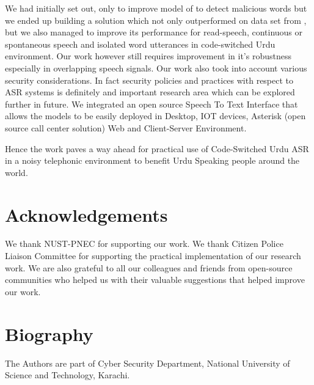 \documentclass[lettersize,journal]{IEEEtran}
\begin{document}
We had initially set out, only to improve model of \cite{sehar_gul_detecting_2020} to detect malicious words but we ended up building a solution which not only outperformed on data set from \cite{sehar_gul_detecting_2020,ali_automatic_2015,qureshi_urdu_2021}, but we also managed to improve its performance for read-speech, continuous or spontaneous speech and isolated word utterances in code-switched Urdu environment. Our work however still requires improvement in it's robustness especially in overlapping speech signals. Our work also took into account various security considerations. In fact security policies and practices with respect to ASR systems is definitely and important research area which can be explored further in future. We integrated an open source Speech To Text Interface that allows the models to be easily deployed in Desktop, IOT devices, Asterisk (open source call center solution) Web and Client-Server Environment. 

Hence the work paves a way ahead for practical use of Code-Switched Urdu ASR in a noisy telephonic environment to benefit Urdu Speaking people around the world.


%


%


\newpage


\section{Acknowledgements}
We thank NUST-PNEC for supporting our work. We thank Citizen Police Liaison Committee for supporting the practical implementation of our research work. We are also grateful to all our colleagues and friends from open-source communities who helped us with their valuable suggestions that helped improve our work.


\newpage
\section{Biography}
The Authors are part of Cyber Security Department, National University of Science and Technology, Karachi.
\end{document}
